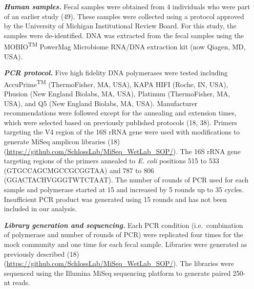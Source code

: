 \documentclass[11pt,]{article}
\begin{document}
\textbf{\emph{Human samples.}} Fecal samples were obtained from 4
individuals who were part of an earlier study (49). These samples were
collected using a protocol approved by the University of Michigan
Institutional Review Board. For this study, the samples were
de-identified. DNA was extracted from the fecal samples using the
MOBIO\textsuperscript{TM} PowerMag Microbiome RNA/DNA extraction kit
(now Qiagen, MD, USA).

\textbf{\emph{PCR protocol.}} Five high fidelity DNA polymerases were
tested including AccuPrime\textsuperscript{TM} (ThermoFisher, MA, USA),
KAPA HIFI (Roche, IN, USA), Phusion (New England Biolabs, MA, USA),
Platinum (ThermoFisher, MA, USA), and Q5 (New England Biolabs, MA, USA).
Manufacturer recommendations were followed except for the annealing and
extension times, which were selected based on previously published
protocols (18, 38). Primers targeting the V4 region of the 16S rRNA gene
were used with modifications to generate MiSeq amplicon libraries (18)
(\url{https://github.com/SchlossLab/MiSeq_WetLab_SOP/}). The 16S rRNA
gene targeting regions of the primers annealed to \emph{E. coli}
positions 515 to 533 (GTGCCAGCMGCCGCGGTAA) and 787 to 806
(GGACTACHVGGGTWTCTAAT). The number of rounds of PCR used for each sample
and polymerase started at 15 and increased by 5 rounds up to 35 cycles.
Insufficient PCR product was generated using 15 rounds and has not been
included in our analysis.

\textbf{\emph{Library generation and sequencing.}} Each PCR condition
(i.e.~combination of polymerase and number of rounds of PCR) were
replicated four times for the mock community and one time for each fecal
sample. Libraries were generated as previously described (18)
(\url{https://github.com/SchlossLab/MiSeq_WetLab_SOP/}). The libraries
were sequenced using the Illumina MiSeq sequencing platform to generate
paired 250-nt reads.
\end{document}
